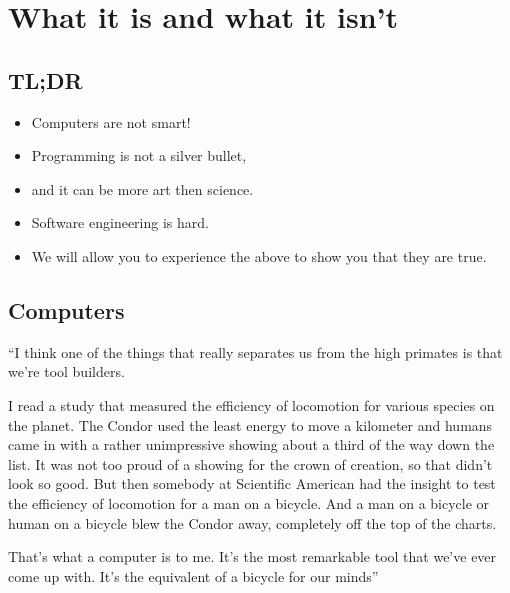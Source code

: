  

\chapter{What it is and what it isn't}

	\section*{TL;DR}
	
	\begin{itemize}
		\item Computers are not smart!
		\item Programming is not a silver bullet,
		\item and it can be more art then science.
		\item Software engineering is hard.
		\item We will allow you to experience the above to show you that they are true.
	\end{itemize}
	\clearpage

	\section{Computers}
	
	``I think one of the things that really separates us from the high primates is that we're tool builders.

	I read a study that measured the efficiency of locomotion for various species on the planet.
	The Condor used the least energy to move a kilometer and humans came in with a rather unimpressive showing about a third of the way down the list.
	It was not too proud of a showing for the crown of creation, so that didn't look so good.
	But then somebody at Scientific American had the insight to test the efficiency of locomotion for a man on a bicycle.
	And a man on a bicycle or human on a bicycle blew the Condor away, completely off the top of the charts.

	That's what a computer is to me.
	It's the most remarkable tool that we've ever come up with. 
	It's the equivalent of a bicycle for our minds''
	
